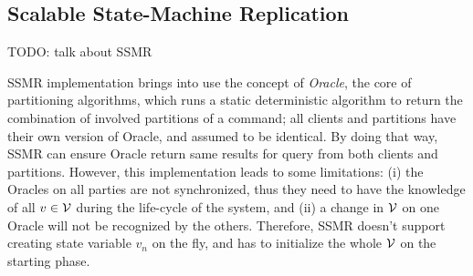 \subsection{Scalable State-Machine Replication}
TODO: talk about SSMR

SSMR implementation brings into use the concept of \emph{Oracle}, the core of partitioning algorithms, which runs a static deterministic algorithm to return the combination of involved partitions of a command; all clients and partitions have their own version of Oracle, and assumed to be identical. By doing that way, SSMR can ensure Oracle return same results for query from both clients and partitions. However, this implementation leads to some limitations: (i) the Oracles on all parties are not synchronized, thus they need to have the knowledge of all $v \in \mathcal{V}$ during the life-cycle of the system, and (ii) a change in $\mathcal{V}$ on one Oracle will not be recognized by the others. Therefore, SSMR doesn't support creating state variable $v_n$ on the fly, and has to initialize the whole $\mathcal{V}$ on the starting phase.
